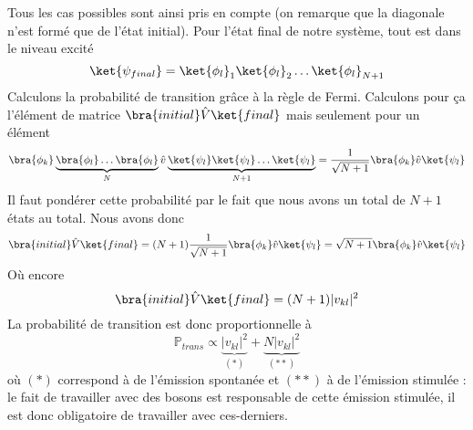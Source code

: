 Tous les cas possibles sont ainsi pris en compte (on remarque que la diagonale n'est formé que de l'état initial).
Pour l'état final de notre système, tout est dans le niveau excité
\begin{equation}
\ket{\psi_{final}} = \ket{\phi_l}_1\ket{\phi_l}_2\dots\ket{\phi_l}_{N+1}
\end{equation}
Calculons la probabilité de transition grâce à la règle de Fermi. Calculons pour ça l'élément de matrice $\bra{initial}\hat{V}\ket{final}$ mais seulement pour un élément
\begin{equation}
\bra{\phi_k}\underbrace{\bra{\phi_l}\dots\bra{\phi_l}}_{N}\hat{v}\underbrace{\ket{\psi_l}\ket{\psi_l}\dots \ket{\psi_l}}_{N+1} = 
\dfrac{1}{\sqrt{N+1}}\bra{\phi_k}\hat{v}\ket{\psi_l}
\end{equation}
Il faut pondérer cette probabilité par le fait que nous avons un total de $N+1$ états au total. Nous avons donc 
\begin{equation}
\bra{initial}\hat{V}\ket{final} = (N+1)\dfrac{1}{\sqrt{N+1}}\bra{\phi_k}\hat{v}\ket{\psi_l} = \sqrt{N+1}\bra{\phi_k}\hat{v}\ket{\psi_l}
\end{equation}
Où encore
\begin{equation}
\bra{initial}\hat{V}\ket{final} = (N+1)|v_{kl}|^2
\end{equation}
La probabilité de transition est donc proportionnelle à
\begin{equation}
\mathbb{P}_{trans} \propto \underbrace{|v_{kl}|^2}_{(*)}+\underbrace{N|v_{kl}|^2}_{(**)}
\end{equation}
où $(*)$ correspond à de l'émission spontanée et $(**)$ à de l'émission stimulée : le fait de travailler avec 
des bosons est responsable de cette émission stimulée, il est donc obligatoire de travailler avec ces-derniers.


